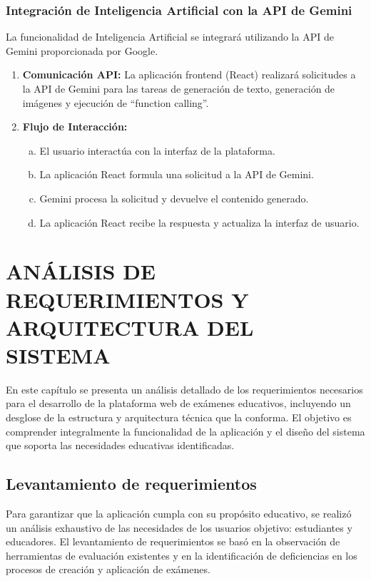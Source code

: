 \documentclass[12pt,a4paper]{report}
\begin{document}
\subsection{Integración de Inteligencia Artificial con la API de Gemini}

La funcionalidad de Inteligencia Artificial se integrará utilizando la API de Gemini proporcionada por Google.

\begin{enumerate}
\item \textbf{Comunicación API:} La aplicación frontend (React) realizará solicitudes a la API de Gemini para las tareas de generación de texto, generación de imágenes y ejecución de ``function calling''.

\item \textbf{Flujo de Interacción:}
\begin{enumerate}[a.]
\item El usuario interactúa con la interfaz de la plataforma.
\item La aplicación React formula una solicitud a la API de Gemini.
\item Gemini procesa la solicitud y devuelve el contenido generado.
\item La aplicación React recibe la respuesta y actualiza la interfaz de usuario.
\end{enumerate}
\end{enumerate}

\chapter{ANÁLISIS DE REQUERIMIENTOS Y ARQUITECTURA DEL SISTEMA}

En este capítulo se presenta un análisis detallado de los requerimientos necesarios para el desarrollo de la plataforma web de exámenes educativos, incluyendo un desglose de la estructura y arquitectura técnica que la conforma. El objetivo es comprender integralmente la funcionalidad de la aplicación y el diseño del sistema que soporta las necesidades educativas identificadas.

\section{Levantamiento de requerimientos}

Para garantizar que la aplicación cumpla con su propósito educativo, se realizó un análisis exhaustivo de las necesidades de los usuarios objetivo: estudiantes y educadores. El levantamiento de requerimientos se basó en la observación de herramientas de evaluación existentes y en la identificación de deficiencias en los procesos de creación y aplicación de exámenes.
\end{document}
